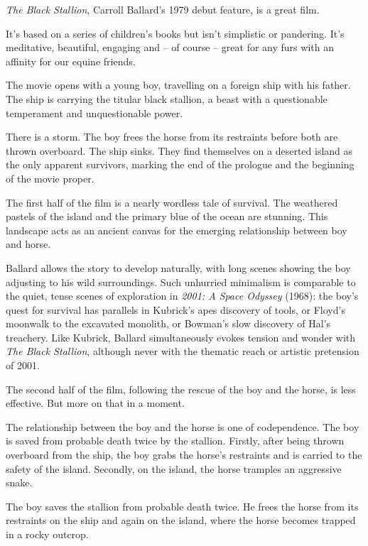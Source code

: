 
\textit{The Black Stallion}, Carroll Ballard's 1979 debut feature, is a great film.

It's based on a series of children's books but isn't simplistic or pandering. It's meditative, beautiful, engaging and -- of course -- great for any furs with an affinity for our equine friends.

The movie opens with a young boy, travelling on a foreign ship with his father. The ship is carrying the titular black stallion, a beast with a questionable temperament and unquestionable power.

There is a storm. The boy frees the horse from its restraints before both are thrown overboard. The ship sinks. They find themselves on a deserted island as the only apparent survivors, marking the end of the prologue and the beginning of the movie proper.

The first half of the film is a nearly wordless tale of survival. The weathered pastels of the island and the primary blue of the ocean are stunning. This landscape acts as an ancient canvas for the emerging relationship between boy and horse.

Ballard allows the story to develop naturally, with long scenes showing the boy adjusting to his wild surroundings. Such unhurried minimalism is comparable to the quiet, tense scenes of exploration in \textit{2001: A Space Odyssey} (1968): the boy's quest for survival has parallels in Kubrick's apes discovery of tools, or Floyd's moonwalk to the excavated monolith, or Bowman's slow discovery of Hal's treachery. Like Kubrick, Ballard simultaneously evokes tension and wonder with \textit{The Black Stallion}, although never with the thematic reach or artistic pretension of 2001.

The second half of the film, following the rescue of the boy and the horse, is less effective. But more on that in a moment.

The relationship between the boy and the horse is one of codependence. The boy is saved from probable death twice by the stallion. Firstly, after being thrown overboard from the ship, the boy grabs the horse's restraints and is carried to the safety of the island. Secondly, on the island, the horse tramples an aggressive snake.

The boy saves the stallion from probable death twice. He frees the horse from its restraints on the ship and again on the island, where the horse becomes trapped in a rocky outcrop.

